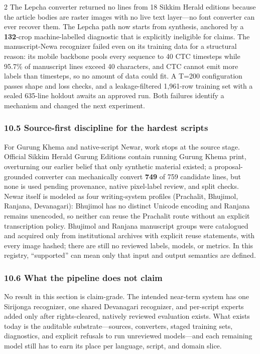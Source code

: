 \documentclass[
  10pt,
]{article}
\begin{document}
\begin{multicols}{2}
The Lepcha converter returned no lines from 18 Sikkim Herald editions
because the article bodies are raster images with no live text
layer---no font converter can ever recover them. The Lepcha path now
starts from synthesis, anchored by a \textbf{132}-crop machine-labelled
diagnostic that is explicitly ineligible for claims. The manuscript-Newa
recognizer failed even on its training data for a structural reason: its
mobile backbone pools every sequence to 40 CTC timesteps while 95.7\% of
manuscript lines exceed 40 characters, and CTC cannot emit more labels
than timesteps, so no amount of data could fit. A T=200 configuration
passes shape and loss checks, and a leakage-filtered 1,961-row training
set with a sealed 635-line holdout awaits an approved run. Both failures
identify a mechanism and changed the next experiment.

\subsubsection{10.5 Source-first discipline for the hardest
scripts}\label{source-first-discipline-for-the-hardest-scripts}

For Gurung Khema and native-script Newar, work stops at the source
stage. Official Sikkim Herald Gurung Editions contain running Gurung
Khema print, overturning our earlier belief that only synthetic material
existed; a proposal-grounded converter can mechanically convert
\textbf{749} of 759 candidate lines, but none is used pending
provenance, native pixel-label review, and split checks. Newar itself is
modeled as four writing-system profiles (Prachalit, Bhujimol, Ranjana,
Devanagari): Bhujimol has no distinct Unicode encoding and Ranjana
remains unencoded, so neither can reuse the Prachalit route without an
explicit transcription policy. Bhujimol and Ranjana manuscript groups
were catalogued and acquired only from institutional archives with
explicit reuse statements, with every image hashed; there are still no
reviewed labels, models, or metrics. In this registry, ``supported'' can
mean only that input and output semantics are defined.

\subsubsection{10.6 What the pipeline does not
claim}\label{what-the-pipeline-does-not-claim}

No result in this section is claim-grade. The intended near-term system
has one Sirijonga recognizer, one shared Devanagari recognizer, and
per-script experts added only after rights-cleared, natively reviewed
evaluation exists. What exists today is the auditable
substrate---sources, converters, staged training sets, diagnostics, and
explicit refusals to run unreviewed models---and each remaining model
still has to earn its place per language, script, and domain slice.


\end{multicols}
\end{document}
